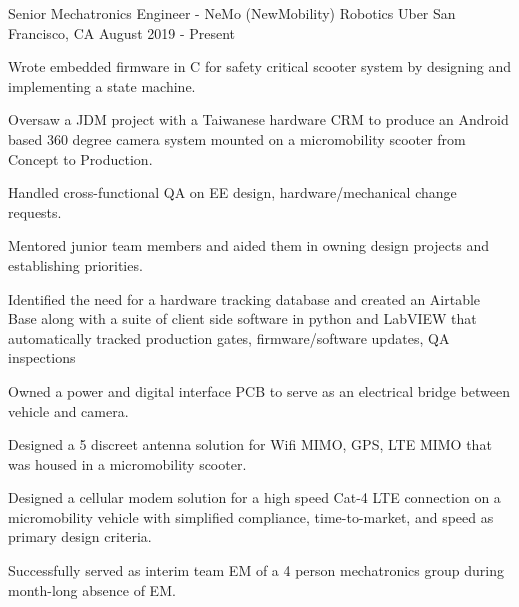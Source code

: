 

\begin{cventries}

  \cventry
    {Senior Mechatronics Engineer - NeMo (NewMobility) Robotics} %
    {Uber} %
    {San Francisco, CA} %
    {August 2019 - Present} %
    {
      \begin{cvitems} %
        \item {Wrote embedded firmware in C for safety critical scooter system by designing and implementing a state machine.} 
        \item {Oversaw a JDM project with a Taiwanese hardware CRM to produce an Android based 360 degree camera system mounted on a micromobility scooter from Concept to Production.}
        \item {Handled cross-functional QA on EE design, hardware/mechanical change requests.}
        \item {Mentored junior team members and aided them in owning design projects and establishing priorities.}
        \item {Identified the need for a hardware tracking database and created an Airtable Base along with a suite of client side software in python and LabVIEW that automatically tracked production gates, firmware/software updates, QA inspections } 
        \item {Owned a power and digital interface PCB to serve as an electrical bridge between vehicle and camera.}
        \item {Designed a 5 discreet antenna solution for Wifi MIMO, GPS, LTE MIMO that was housed in a micromobility scooter.}
        \item {Designed a cellular modem solution for a high speed Cat-4 LTE connection on a micromobility vehicle with simplified compliance, time-to-market, and speed as primary design criteria.}
        \item {Successfully served as interim team EM of a 4 person mechatronics group during month-long absence of EM.}
      \end{cvitems}
    }


\end{cventries}
